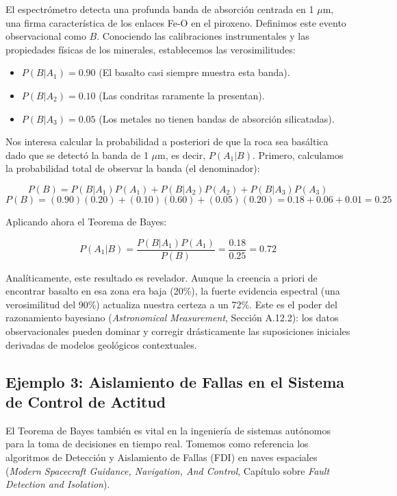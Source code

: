 El espectrómetro detecta una profunda banda de absorción centrada en 1 $\mu$m, una firma característica de los enlaces Fe-O en el piroxeno. Definimos este evento observacional como $B$. Conociendo las calibraciones instrumentales y las propiedades físicas de los minerales, establecemos las verosimilitudes:
\begin{itemize}
    \item $P(B | A_1) = 0.90$ (El basalto casi siempre muestra esta banda).
    \item $P(B | A_2) = 0.10$ (Las condritas raramente la presentan).
    \item $P(B | A_3) = 0.05$ (Los metales no tienen bandas de absorción silicatadas).
\end{itemize}

Nos interesa calcular la probabilidad a posteriori de que la roca sea basáltica dado que se detectó la banda de 1 $\mu$m, es decir, $P(A_1 | B)$. Primero, calculamos la probabilidad total de observar la banda (el denominador):

$$ P(B) = P(B | A_1)P(A_1) + P(B | A_2)P(A_2) + P(B | A_3)P(A_3) $$
$$ P(B) = (0.90)(0.20) + (0.10)(0.60) + (0.05)(0.20) = 0.18 + 0.06 + 0.01 = 0.25 $$

Aplicando ahora el Teorema de Bayes:

$$ P(A_1 | B) = \frac{P(B | A_1) P(A_1)}{P(B)} = \frac{0.18}{0.25} = 0.72 $$

Analíticamente, este resultado es revelador. Aunque la creencia a priori de encontrar basalto en esa zona era baja (20\%), la fuerte evidencia espectral (una verosimilitud del 90\%) actualiza nuestra certeza a un 72\%. Este es el poder del razonamiento bayesiano (\textit{Astronomical Measurement}, Sección A.12.2): los datos observacionales pueden dominar y corregir drásticamente las suposiciones iniciales derivadas de modelos geológicos contextuales.

\subsection{Ejemplo 3: Aislamiento de Fallas en el Sistema de Control de Actitud}

El Teorema de Bayes también es vital en la ingeniería de sistemas autónomos para la toma de decisiones en tiempo real. Tomemos como referencia los algoritmos de Detección y Aislamiento de Fallas (FDI) en naves espaciales (\textit{Modern Spacecraft Guidance, Navigation, And Control}, Capítulo sobre \textit{Fault Detection and Isolation}).

